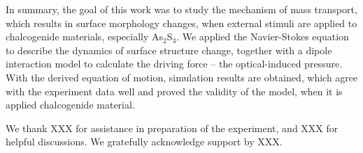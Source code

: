 \documentclass[aps, prl, twocolumn, groupedaddress]{revtex4-1}
\begin{document}

In summary, the goal of this work was to study the mechanism of mass transport,
which results in surface morphology changes, when external stimuli are
applied to chalcogenide materials, especially As$_2$S$_3$. We applied
the Navier-Stokes equation to describe the dynamics of surface
structure change, together with a dipole interaction model to
calculate the driving force -- the optical-induced pressure. With the
derived equation of motion, simulation results are obtained, which agree
with the experiment data well and proved the validity of the model,
when it is applied chalcogenide material.

We thank XXX for assistance in preparation of the experiment, and XXX
for helpful discussions. We gratefully acknowledge support by XXX.

\end{document}
